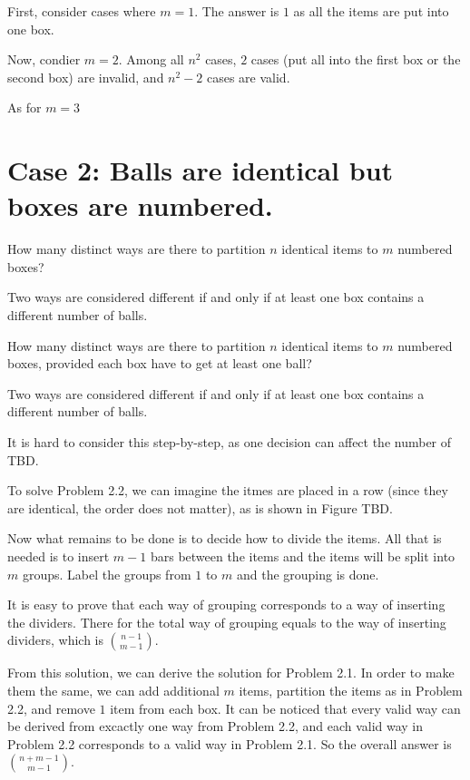 \documentclass[a4paper]{article}
\begin{document}
First, consider cases where $m = 1$. The answer is $1$ as all the items are put into one box.

Now, condier $m = 2$. Among all $n^2$ cases, $2$ cases (put all into the first box or the second box) are invalid, and $n^2 - 2$ cases are valid.

As for $m = 3$

\section{Case 2: Balls are identical but boxes are numbered.}

\begin{tcolorbox}[title = Problem 2.1]
    How many distinct ways are there to partition $n$ identical items to $m$ numbered boxes? 

    Two ways are considered different if and only if at least one box contains a different number of balls. 
\end{tcolorbox}

\begin{tcolorbox}[title = Problem 2.2]
    How many distinct ways are there to partition $n$ identical items to $m$ numbered boxes, provided each box have to get at least one ball? 

    Two ways are considered different if and only if at least one box contains a different number of balls. 
\end{tcolorbox}

It is hard to consider this step-by-step, as one decision can affect the number of TBD.

To solve Problem 2.2, we can imagine the itmes are placed in a row (since they are identical, the order does not matter), as is shown in Figure TBD.

Now what remains to be done is to decide how to divide the items. All that is needed is to insert $m-1$ bars between the items and the items will be split into $m$ groups. Label the groups from $1$ to $m$ and the grouping is done.

It is easy to prove that each way of grouping corresponds to a way of inserting the dividers. There for the total way of grouping equals to the way of inserting dividers, which is ${n-1 \choose m-1}$. 

From this solution, we can derive the solution for Problem 2.1. In order to make them the same, we can add additional $m$ items, partition the items as in Problem 2.2, and remove $1$ item from each box. It can be noticed that every valid way can be derived from excactly one way from Problem 2.2, and each valid way in Problem 2.2 corresponds to a valid way in Problem 2.1. So the overall answer is ${n+m-1 \choose m-1}$.
\end{document}
